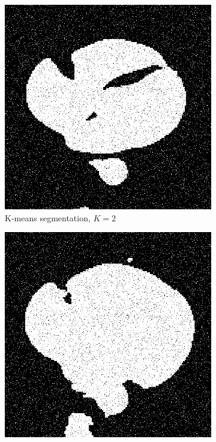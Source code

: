 \documentclass[UTF8]{ctexart}
\begin{document}
\begin{figure}[htbp]
    \vspace{0.5cm}
    \centering
    \begin{subfigure}{0.2\textwidth}
        \centering
        \includegraphics[width=\linewidth]{heart_kmeans2.png}
        \caption{K-means segmentation, $K=2$}
    \end{subfigure}%
    \hfill
    \begin{subfigure}{0.2\textwidth}
        \centering
        \includegraphics[width=\linewidth]{heart_gmm2.png}

\end{subfigure}
\end{figure}
\end{document}

